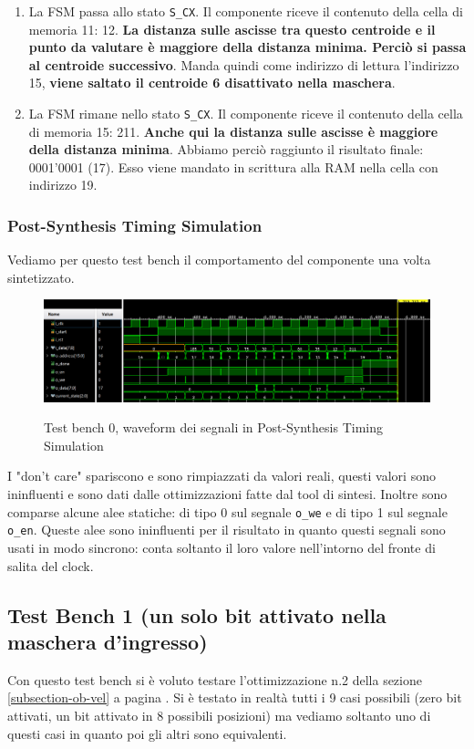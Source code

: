 \documentclass{article}
\begin{document}
\begin{enumerate}
    \item La FSM passa allo stato \verb^S_CX^. Il componente riceve il contenuto della cella di memoria 11: 12. \textbf{La distanza sulle ascisse tra questo centroide e il punto da valutare è maggiore della distanza minima. Perciò si passa al centroide successivo}. Manda quindi come indirizzo di lettura l'indirizzo 15, \textbf{viene saltato il centroide 6 disattivato nella maschera}.
    \item La FSM rimane nello stato \verb^S_CX^. Il componente riceve il contenuto della cella di memoria 15: 211. \textbf{Anche qui la distanza sulle ascisse è maggiore della distanza minima}. Abbiamo perciò raggiunto il risultato finale: 0001'0001 (17). Esso viene mandato in scrittura alla RAM nella cella con indirizzo 19.
\end{enumerate}

\subsubsection{Post-Synthesis Timing Simulation}
Vediamo per questo test bench il comportamento del componente una volta sintetizzato.
\begin{figure}[H]
    \centering
    \caption{Test bench 0, waveform dei segnali in Post-Synthesis Timing Simulation}
    \includegraphics[width=1.0\textwidth]{images/test-bench-0-timing.png}
    \label{fig:test-bench-0-timing}
\end{figure}
\noindent I "don't care" spariscono e sono rimpiazzati da valori reali, questi valori sono ininfluenti e sono dati dalle ottimizzazioni fatte dal tool di sintesi. Inoltre sono comparse alcune alee statiche: di tipo 0 sul segnale \verb^o_we^ e di tipo 1 sul segnale \verb^o_en^. Queste alee sono ininfluenti per il risultato in quanto questi segnali sono usati in modo sincrono: conta soltanto il loro valore nell'intorno del fronte di salita del clock.

\subsection{Test Bench 1 (un solo bit attivato nella maschera d'ingresso)}
Con questo test bench si è voluto testare l'ottimizzazione n.2 della sezione \ref{subsection-ob-vel} a pagina \pageref{subsection-ob-vel}. Si è testato in realtà tutti i 9 casi possibili (zero bit attivati, un bit attivato in 8 possibili posizioni) ma vediamo soltanto uno di questi casi in quanto poi gli altri sono equivalenti.
\end{document}
